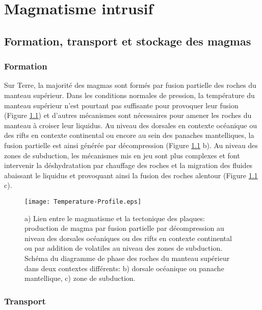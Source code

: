 \chapter{Magmatisme intrusif}
\label{chap1}
\minitoc

\section{Formation, transport et stockage des magmas}
\label{C1-sec:magm-intr-un}

\subsection{Formation}
\label{C1-sec:formation-1}

Sur Terre, la majorité des magmas sont formés par fusion partielle des
roches du manteau supérieur. Dans les conditions normales de
pression, la température du manteau supérieur n'est pourtant pas
suffisante pour provoquer leur fusion (Figure \ref{C1-Geoterme}) et
d'autres mécanismes sont nécessaires pour amener les roches du manteau
à croiser leur liquidus. Au niveau des dorsales en contexte
océanique ou des rifts en contexte continental ou encore au sein des
panaches mantelliques, la fusion partielle est ainsi générée par
décompression (Figure \ref{C1-Geoterme} b). Au niveau des zones de
subduction, les mécanismes mis en jeu sont plus complexes et font
intervenir la déshydratation par chauffage des roches et la migration
des fluides abaissant le liquidus et provoquant ainsi la fusion des
roches alentour (Figure \ref{C1-Geoterme} c).
\begin{figure}[h!]
 \begin{center}
 \graphicspath{ {/Users/thorey/Documents/These/Manuscript/Figure/Chapter1/} }
 \texttt{[image: Temperature-Profile.eps]}
 \caption{a) Lien entre le magmatisme et la tectonique des plaques:
 production de magma par fusion partielle par décompression au
 niveau des dorsales océaniques ou des rifts en contexte
 continental ou par addition de volatiles au niveau des zones de
 subduction. Schéma du diagramme de phase des roches du manteau
 supérieur dans deux contextes différents: b) dorsale océanique
 ou panache mantellique, c) zone de subduction.}
 \label{C1-Geoterme}
 \end{center}
\end{figure}

\subsection{Transport}
\label{C1-sec:transport}

